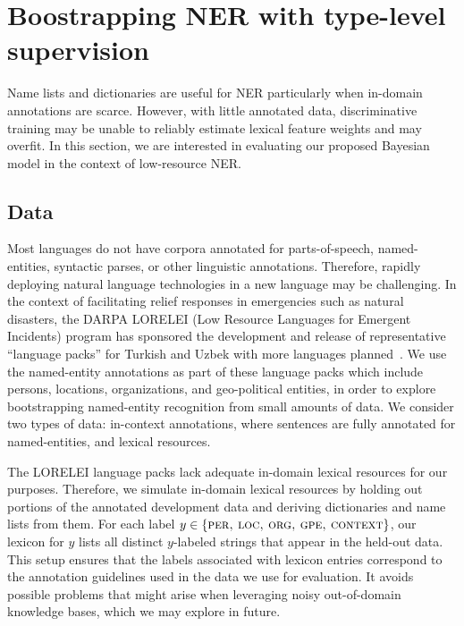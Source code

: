 \documentclass[11pt]{article}
\newcommand{\circone}{\ding{172}\xspace}
\newcommand{\circtwo}{\ding{173}\xspace}
\begin{document}
\section{Boostrapping NER with type-level supervision}\label{sec:ner}

Name lists and dictionaries are useful for NER particularly when in-domain annotations are scarce.
However, with little annotated data, discriminative training may be unable to reliably estimate lexical feature weights and may overfit. In this section, we are interested in evaluating our proposed Bayesian model in the context of low-resource NER.

\vspace{5pt}

\subsection{Data}\label{sec:nerdata}

Most languages do not have corpora annotated for parts-of-speech, named-entities, syntactic parses, or other linguistic annotations. Therefore, rapidly deploying natural language technologies in a new language may be challenging.
In the context of facilitating relief responses in emergencies such as
natural disasters, the DARPA LORELEI (Low Resource Languages for
Emergent Incidents) program has sponsored the development and release
of representative ``language packs'' for Turkish and Uzbek with more languages planned~\cite{lorelei2016}.
We use the named-entity annotations as
part of these language packs which include persons, locations,
organizations, and geo-political entities, in order to explore bootstrapping
named-entity recognition from small amounts of data. We consider two types of data: \circone in-context annotations, where sentences are fully annotated for named-entities, and \circtwo lexical resources.

The LORELEI language packs lack adequate in-domain lexical resources for our purposes. Therefore, we simulate in-domain lexical resources by holding out portions of the
annotated development data and deriving dictionaries and name lists from them. 
For each label $y \in \{\textsc{per, loc, org, gpe, context}\}$,  our lexicon for $y$
lists all distinct $y$-labeled strings that appear in the held-out data.
This setup ensures that the labels associated with lexicon entries correspond to the annotation guidelines used in the data we use for evaluation.  It avoids possible problems that might arise when leveraging noisy out-of-domain knowledge bases, which we may explore in future.
\end{document}
